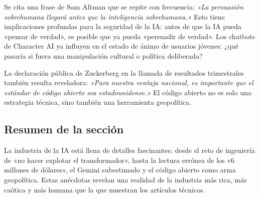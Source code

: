 Se cita una frase de Sam Altman que se repite con frecuencia: \textit{«La persuasión sobrehumana llegará antes que la inteligencia sobrehumana.»} Esto tiene implicaciones profundas para la seguridad de la IA: antes de que la IA pueda «pensar de verdad», es posible que ya pueda «persuadir de verdad». Los chatbots de Character AI ya influyen en el estado de ánimo de usuarios jóvenes: ¿qué pasaría si fuera una manipulación cultural o política deliberada?

La declaración pública de Zuckerberg en la llamada de resultados trimestrales también resulta reveladora: \textit{«Para nuestra ventaja nacional, es importante que el estándar de código abierto sea estadounidense.»} El código abierto no es solo una estrategia técnica, sino también una herramienta geopolítica.

\subsection{Resumen de la sección}

La industria de la IA está llena de detalles fascinantes: desde el reto de ingeniería de «no hacer explotar el transformador», hasta la lectura errónea de los «6 millones de dólares», el Gemini subestimado y el código abierto como arma geopolítica. Estas anécdotas revelan una realidad de la industria más rica, más caótica y más humana que la que muestran los artículos técnicos.

